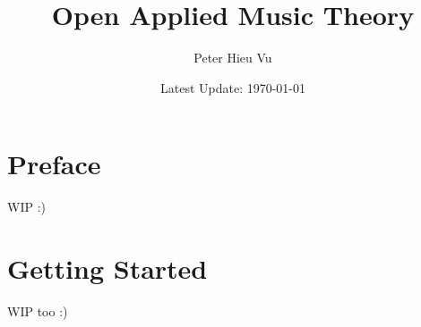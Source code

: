 \documentclass[12pt]{book}
\title{Open Applied Music Theory}
\author{Peter Hieu Vu}
\date{Latest Update: \today}
\newcommand\onlyinsubfile[1]{#1}
\newcommand\notinsubfile[1]{}
\begin{document}
    \renewcommand{\onlyinsubfile}[1]{}
    \renewcommand{\notinsubfile}[1]{#1}

    \maketitle

    \frontmatter

    \tableofcontents

    \setcounter{page}{1}

    \chapter{Preface}
        
    WIP :)

    \newpage

    \mainmatter 
    \setcounter{page}{1}
    \setcounter{chapter}{-1}
    
    \chapter{Getting Started}
        
    WIP too :)
    
\end{document}

